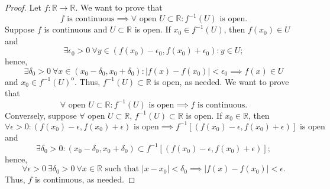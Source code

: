 \documentclass[12pt]{article}
\theoremstyle{definition}
\begin{document}
\begin{proof}
    Let \(f : \mathbb{R} \to \mathbb{R}\). We want to prove that
    \[
        f \text{ is continuous} \implies \forall \text{ open } U \subset \mathbb{R} : f^{-1}(U) \text{ is open}. 
    \]
    Suppose \(f\) is continuous and \(U \subset \mathbb{R}\) is open. If \(x_0 \in f^{-1}(U)\), then \(f(x_0) \in U\) and
    \[
        \exists \epsilon_0 > 0 \ \forall y \in (f(x_0) - \epsilon_0, f(x_0) + \epsilon_0) : y \in U;
    \]
    hence,
    \[
        \exists \delta_0 > 0 \ \forall x \in (x_0 - \delta_0, x_0 + \delta_0) : \vert f(x) - f(x_0) \vert < \epsilon_0 \implies f(x) \in U
    \]
    and \(x_0 \in f^{-1}(U)^{\mathrm{o}}\). Thus, \(f^{-1}(U) \subset \mathbb{R}\) is open, as needed. We want to prove that
    \[
        \forall \text{ open } U \subset \mathbb{R} : f^{-1}(U) \text{ is open} \implies f \text{ is continuous}.
    \]
    Conversely, suppose \(\forall\) open \(U \subset \mathbb{R}\), \(f^{-1}(U) \subset \mathbb{R}\) is open. If \(x_0 \in \mathbb{R}\), then
    \[
        \forall \epsilon > 0 : (f(x_0) - \epsilon, f(x_0) + \epsilon) \text{ is open} \implies f^{-1}[(f(x_0) - \epsilon, f(x_0) + \epsilon)] \text{ is open}
    \]
    and 
    \[
        \exists \delta_0 > 0 : (x_0 - \delta_0, x_0 + \delta_0) \subset f^{-1}[(f(x_0) - \epsilon, f(x_0) + \epsilon)];
    \]
    hence,
    \[
        \forall \epsilon > 0 \ \exists \delta_0 > 0 \ \forall x \in \mathbb{R} \text{ such that } \vert x - x_0 \vert < \delta_0 \implies \vert f(x) - f(x_0) \vert < \epsilon.
    \]
    Thus, \(f\) is continuous, as needed.
\end{proof}
\end{document}
